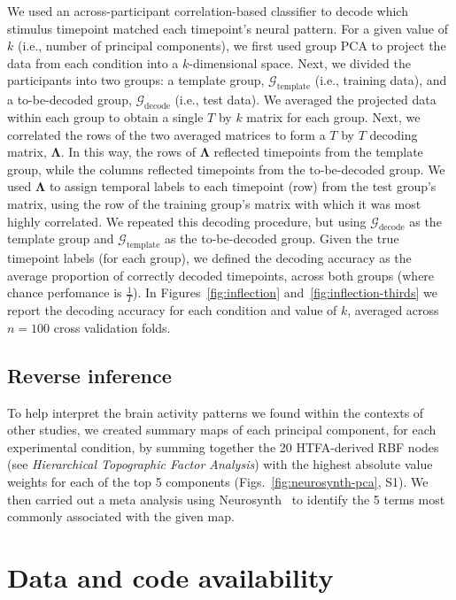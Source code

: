 \documentclass[english, 11pt]{article}
\newcommand{\synthThirds}{S1}
\begin{document}
We used an across-participant correlation-based classifier to decode which
stimulus timepoint matched each timepoint's neural pattern. For a given value
of $k$ (i.e., number of principal components), we first used group PCA to
project the data from each condition into a $k$-dimensional space. Next, we
divided the participants into two groups: a template group,
$\mathcal{G}_{\mathrm{template}}$ (i.e., training data), and a to-be-decoded
group, $\mathcal{G}_{\mathrm{decode}}$ (i.e., test data). We averaged the
projected data within each group to obtain a single $T$ by $k$ matrix for each
group. Next, we correlated the rows of the two averaged matrices to form a $T$
by $T$ decoding matrix, $\mathbf{\Lambda}$. In this way, the rows of
$\mathbf{\Lambda}$ reflected timepoints from the template group, while the
columns reflected timepoints from the to-be-decoded group. We used
$\mathbf{\Lambda}$ to assign temporal labels to each timepoint (row) from the
test group's matrix, using the row of the training group's matrix with which it
was most highly correlated. We repeated this decoding procedure, but using
$\mathcal{G}_{\mathrm{decode}}$ as the template group and
$\mathcal{G}_{\mathrm{template}}$ as the to-be-decoded group. Given the true
timepoint labels (for each group), we defined the decoding accuracy as the
average proportion of correctly decoded timepoints, across both groups (where
chance perfomance is $\frac{1}{T}$). In Figures~\ref{fig:inflection}
and~\ref{fig:inflection-thirds} we report the decoding accuracy for each
condition and value of $k$, averaged across $n = 100$ cross validation folds.

\subsection*{Reverse inference}

To help interpret the brain activity patterns we found within the contexts of
other studies, we created summary maps of each principal component, for each
experimental condition, by summing together the 20 HTFA-derived RBF nodes (see
\textit{Hierarchical Topographic Factor Analysis}) with the highest absolute
value weights for each of the top 5 components (Figs.~\ref{fig:neurosynth-pca},
\synthThirds). We then carried out a meta analysis using
Neurosynth~\cite{RubiEtal17} to identify the 5 terms most commonly associated
with the given map.


\section*{Data and code availability}
\end{document}
